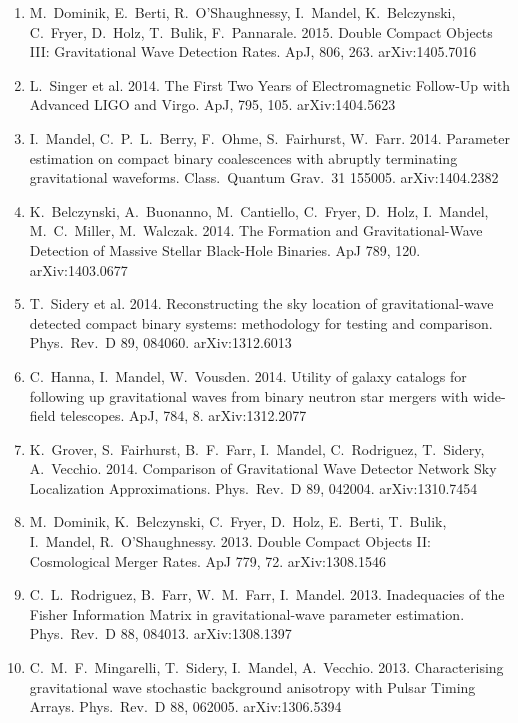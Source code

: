 \documentclass[margin,line]{res}
\begin{document}
\begin{resume}
\begin{enumerate}
\item  M.~Dominik, E.~Berti, R.~O'Shaughnessy, I.~Mandel, K.~Belczynski, C.~Fryer, D.~Holz, T.~Bulik,  F.~Pannarale. 2015. Double Compact Objects III: Gravitational Wave Detection Rates.  ApJ, 806, 263.  arXiv:1405.7016

\item  L.~Singer et al. 2014. The First Two Years of Electromagnetic Follow-Up with Advanced LIGO and Virgo.  ApJ, 795, 105. arXiv:1404.5623

\item  I.~Mandel, C.~P.~L.~Berry, F.~Ohme, S.~Fairhurst, W.~Farr.  2014. Parameter estimation on compact binary coalescences with abruptly terminating gravitational waveforms.  Class.~Quantum Grav.~31 155005. arXiv:1404.2382

\item  K.~Belczynski, A.~Buonanno, M.~Cantiello, C.~Fryer, D.~Holz, I.~Mandel, M.~C.~Miller, M.~Walczak.  2014. The Formation and Gravitational-Wave Detection of Massive Stellar Black-Hole Binaries.  ApJ 789, 120. arXiv:1403.0677

\item  T.~Sidery et al. 2014. Reconstructing the sky location of gravitational-wave detected compact binary systems: methodology for testing and comparison.  Phys.~Rev.~D 89, 084060.  arXiv:1312.6013

\item  C.~Hanna, I.~Mandel, W.~Vousden.  2014. Utility of galaxy catalogs for following up gravitational waves from binary neutron star mergers with wide-field telescopes. ApJ, 784, 8.  arXiv:1312.2077

\item  K.~Grover, S.~Fairhurst, B.~F.~Farr, I.~Mandel, C.~Rodriguez, T.~Sidery, A.~Vecchio.  2014.  Comparison of Gravitational Wave Detector Network Sky Localization Approximations.  Phys.~Rev.~D 89, 042004.  arXiv:1310.7454

\item  M.~Dominik, K.~Belczynski, C.~Fryer, D.~Holz, E.~Berti, T.~Bulik, I.~Mandel, R.~O'Shaughnessy. 2013.  Double Compact Objects II: Cosmological Merger Rates.  ApJ 779, 72. arXiv:1308.1546

\item  C.~L.~Rodriguez, B.~Farr, W.~M.~Farr, I.~Mandel.  2013.  Inadequacies of the Fisher Information Matrix in gravitational-wave parameter estimation.  Phys.~Rev.~D 88, 084013.  arXiv:1308.1397 

\item  C.~M.~F.~Mingarelli, T.~Sidery, I.~Mandel, A.~Vecchio.  2013.  Characterising gravitational wave stochastic background anisotropy with Pulsar Timing Arrays.  Phys.~Rev.~D 88, 062005. arXiv:1306.5394


\end{enumerate}
\end{resume}
\end{document}
